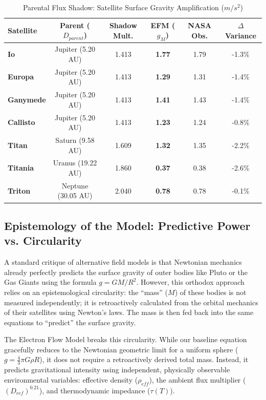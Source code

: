 \documentclass[11pt, a4paper]{article}
\begin{document}
\begin{table}[!ht]
  \centering
  \caption{Parental Flux Shadow: Satellite Surface Gravity Amplification ($m/s^2$)}
  \vspace{0.5em}
  \begin{tabular}{l c c c c c} 
    \toprule
    \textbf{Satellite} & \textbf{Parent ($D_{parent}$)} & \textbf{Shadow Mult.} & \textbf{EFM ($g_M$)} & \textbf{NASA Obs.} & \textbf{$\Delta$ Variance} \\
    \midrule
    \textbf{Io} & Jupiter (5.20 AU) & 1.413 & \textbf{1.77} & 1.79 & -1.3\% \\
    \textbf{Europa} & Jupiter (5.20 AU) & 1.413 & \textbf{1.29} & 1.31 & -1.4\% \\
    \textbf{Ganymede} & Jupiter (5.20 AU) & 1.413 & \textbf{1.41} & 1.43 & -1.4\% \\
    \textbf{Callisto} & Jupiter (5.20 AU) & 1.413 & \textbf{1.23} & 1.24 & -0.8\% \\
    \midrule
    \textbf{Titan} & Saturn (9.58 AU) & 1.609 & \textbf{1.32} & 1.35 & -2.2\% \\
    \midrule
    \textbf{Titania} & Uranus (19.22 AU) & 1.860 & \textbf{0.37} & 0.38 & -2.6\% \\
    \midrule
    \textbf{Triton} & Neptune (30.05 AU) & 2.040 & \textbf{0.78} & 0.78 & -0.1\% \\
    \bottomrule
  \end{tabular}
\end{table}

\subsection{Epistemology of the Model: Predictive Power vs. Circularity}
A standard critique of alternative field models is that Newtonian mechanics already perfectly predicts the surface gravity of outer bodies like Pluto or the Gas Giants using the formula $g = GM/R^2$. However, this orthodox approach relies on an epistemological circularity: the ``mass'' ($M$) of these bodies is not measured independently; it is retroactively calculated from the orbital mechanics of their satellites using Newton's laws. The mass is then fed back into the same equations to ``predict'' the surface gravity. 

The Electron Flow Model breaks this circularity. While our baseline equation gracefully reduces to the Newtonian geometric limit for a uniform sphere ($g = \frac{4}{3}\pi G \rho R$), it does not require a retroactively derived total mass. Instead, it predicts gravitational intensity using independent, physically observable environmental variables: effective density ($\rho_{eff}$), the ambient flux multiplier ($(D_{ref})^{0.21}$), and thermodynamic impedance ($\tau(T)$). 
\end{document}
